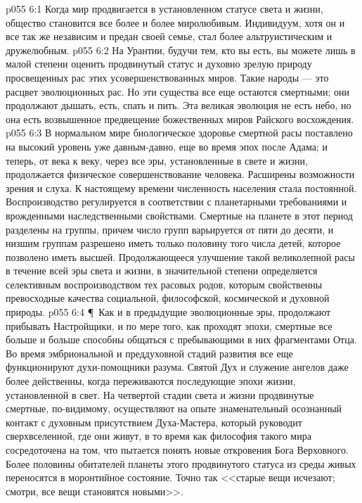 \vs p055 6:1 Когда мир продвигается в установленном статусе света и жизни, общество становится все более и более миролюбивым. Индивидуум, хотя он и все так же независим и предан своей семье, стал более альтруистическим и дружелюбным.
\vs p055 6:2 На Урантии, будучи тем, кто вы есть, вы можете лишь в малой степени оценить продвинутый статус и духовно зрелую природу просвещенных рас этих усовершенствованных миров. Такие народы --- это расцвет эволюционных рас. Но эти существа все еще остаются смертными; они продолжают дышать, есть, спать и пить. Эта великая эволюция не есть небо, но она есть возвышенное предвещение божественных миров Райского восхождения.
\vs p055 6:3 В нормальном мире биологическое здоровье смертной расы поставлено на высокий уровень уже давным\hyp{}давно, еще во время эпох после Адама; и теперь, от века к веку, через все эры, установленные в свете и жизни, продолжается физическое совершенствование человека. Расширены возможности зрения и слуха. К настоящему времени численность населения стала постоянной. Воспроизводство регулируется в соответствии с планетарными требованиями и врожденными наследственными свойствами. Смертные на планете в этот период разделены на группы, причем число групп варьируется от пяти до десяти, и низшим группам разрешено иметь только половину того числа детей, которое позволено иметь высшей. Продолжающееся улучшение такой великолепной расы в течение всей эры света и жизни, в значительной степени определяется селективным воспроизводством тех расовых родов, которым свойственны превосходные качества социальной, философской, космической и духовной природы.
\vs p055 6:4 \P\ Как и в предыдущие эволюционные эры, продолжают прибывать Настройщики, и по мере того, как проходят эпохи, смертные все больше и больше способны общаться с пребывающими в них фрагментами Отца. Во время эмбриональной и преддуховной стадий развития все еще функционируют духи\hyp{}помощники разума. Святой Дух и служение ангелов даже более действенны, когда переживаются последующие эпохи жизни, установленной в свет. На четвертой стадии света и жизни продвинутые смертные, по\hyp{}видимому, осуществляют на опыте знаменательный осознанный контакт с духовным присутствием Духа\hyp{}Мастера, который руководит сверхвселенной, где они живут, в то время как философия такого мира сосредоточена на том, что пытается понять новые откровения Бога Верховного. Более половины обитателей планеты этого продвинутого статуса из среды живых переносятся в моронтийное состояние. Точно так <<старые вещи исчезают; смотри, все вещи становятся новыми>>.
